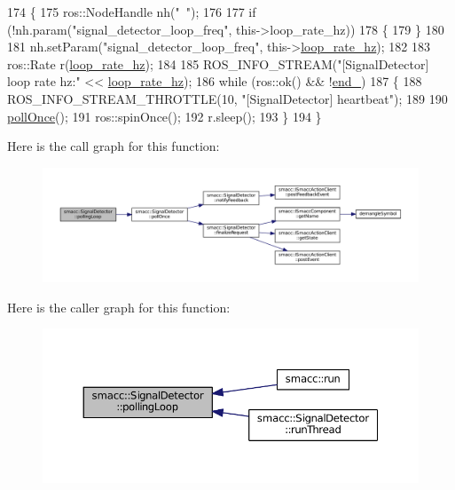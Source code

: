 \begin{DoxyCode}
174 \{
175     ros::NodeHandle nh(\textcolor{stringliteral}{"~"});
176 
177     \textcolor{keywordflow}{if} (!nh.param(\textcolor{stringliteral}{"signal\_detector\_loop\_freq"}, this->loop\_rate\_hz))
178     \{
179     \}
180 
181     nh.setParam(\textcolor{stringliteral}{"signal\_detector\_loop\_freq"}, this->\hyperlink{classsmacc_1_1SignalDetector_a41a2ae4262ed350f46d8b886bdc1dfa5}{loop\_rate\_hz});
182 
183     ros::Rate r(\hyperlink{classsmacc_1_1SignalDetector_a41a2ae4262ed350f46d8b886bdc1dfa5}{loop\_rate\_hz});
184 
185     ROS\_INFO\_STREAM(\textcolor{stringliteral}{"[SignalDetector] loop rate hz:"} << \hyperlink{classsmacc_1_1SignalDetector_a41a2ae4262ed350f46d8b886bdc1dfa5}{loop\_rate\_hz});
186     \textcolor{keywordflow}{while} (ros::ok() && !\hyperlink{classsmacc_1_1SignalDetector_aaee266393c01693528a2d74b1f2354a2}{end\_})
187     \{
188         ROS\_INFO\_STREAM\_THROTTLE(10, \textcolor{stringliteral}{"[SignalDetector] heartbeat"});
189 
190         \hyperlink{classsmacc_1_1SignalDetector_a9a116479e23259f3a5d5d4a47278afd5}{pollOnce}();
191         ros::spinOnce();
192         r.sleep();
193     \}
194 \}
\end{DoxyCode}


Here is the call graph for this function\+:
\nopagebreak
\begin{figure}[H]
\begin{center}
\leavevmode
\includegraphics[width=350pt]{classsmacc_1_1SignalDetector_a2665e66cdae9f6533c64bbcecf3fa199_cgraph}
\end{center}
\end{figure}




Here is the caller graph for this function\+:
\nopagebreak
\begin{figure}[H]
\begin{center}
\leavevmode
\includegraphics[width=350pt]{classsmacc_1_1SignalDetector_a2665e66cdae9f6533c64bbcecf3fa199_icgraph}
\end{center}
\end{figure}


